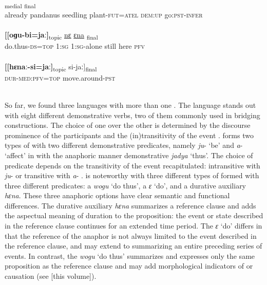 \documentclass[output=paper]{LSP/langsci}
\begin{document}
\begin{exe}
\ex \label{GuAiAiex:30ac}
\begin{xlist}
\ex \label{GuAiAiex:30a}
\gll	[ɛimɛ	oɡa	ɛ	ɡɛ-mɛna=ta]\textsubscript{medial}	\underline{\smash{[holo}}	\underline{\smash{anɛ-obo]}}\textsubscript{final}\\
already	pandanus	seedling	plant-\textsc{fut=atel}	\textsc{dem:up}	go:\textsc{pst-infer}\\
\glt ‎\\
\ex \label{GuAiAiex:30b}
\gll	\textbf{[[oɡu-bi=jaː]}\textsubscript{topic}	\underline{nɛ}	\underline{}	\underline{ɛna}	\underline{}	\underline{\smash{di]}}\textsubscript{final}\\
do.thus\textsc{-ds=top}	\textsc{1:sg}	\textsc{1:sg-}alone	still	here	\textsc{pfv}\\
\glt {}\\
\ex \label{GuAiAiex:30c}
\gll	\textbf{[[hɛnaː-si=jaː]}\textsubscript{topic}	si-jaː]\textsubscript{final}\\
\textsc{dur-med:pfv=top}	move.around\textsc{-pst}\\
\glt	{}\\
\end{xlist}
\end{exe}

So far, we found three languages with more than one . The language  stands out with  eight different demonstrative verbs, two of them  commonly used in bridging constructions. The choice of one over the other is determined by the discourse prominence of the participants and the (in)transitivity of the event \citep[][257, 499, 589]{overall17}.  forms two types of  with two different demonstrative predicates, namely \textit{ju}- `be' and \textit{a}- `affect' in  with the anaphoric manner demonstrative \textit{jadya} `thus'. The choice of predicate depends on the transitivity of the event recapitulated: intransitive with \textit{ju}- or transitive with \textit{a}- \citep[][128]{Guillaume2011}.  is noteworthy with three different types of  formed with three different predicates: a  \textit{wogu} `do thus', a  \textit{ɛ} `do', and a durative auxiliary \textit{hɛna}. These three anaphoric options have clear semantic and functional differences. The durative auxiliary \textit{hɛna} summarizes a reference clause and adds the aspectual meaning of duration to the proposition: the event or state described in the reference clause continues for an extended time period. The  \textit{ɛ} `do' differs in that the reference of the anaphor is not always limited to the event described in the reference clause, and may extend to summarizing an entire preceding series of events. In contrast, the  \textit{wogu} `do thus' summarizes and expresses only the same proposition as the reference clause and may add morphological indicators of  or causation (see \citealt{chapters/06Aiton} [this volume]).
\end{document}
